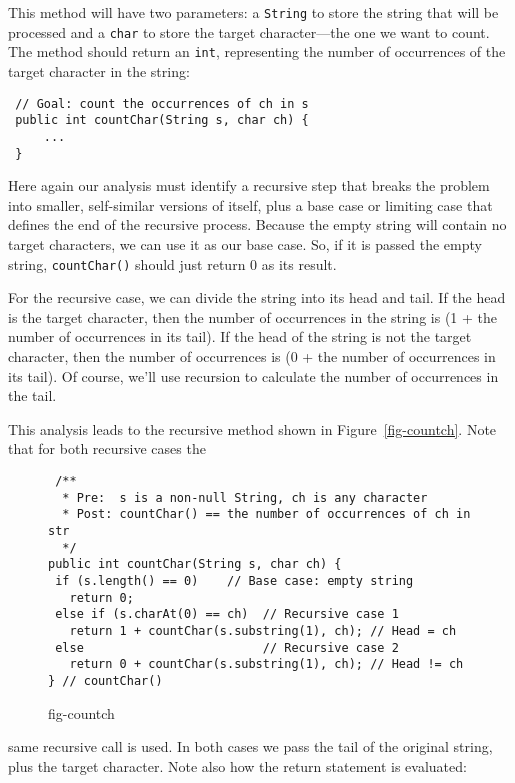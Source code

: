 This method will have two parameters: a {\tt String} to store the
string that will be processed and a {\tt char} to store the
target character---the one we want to count.   The method should
return an {\tt int}, representing the number of occurrences of the
target character in the string:

\begin{jjjlisting}
\begin{lstlisting}
 // Goal: count the occurrences of ch in s
 public int countChar(String s, char ch) {
     ...
 }
\end{lstlisting}
\end{jjjlisting}

Here again our analysis must identify a recursive step that breaks the
problem into smaller, self-similar versions of itself, plus a base
case or limiting case that defines the end of the recursive process.
Because the empty string will contain no target characters, we can use
it as our base case.  So, if it is passed the empty string,
 {\tt countChar()} should just return 0 as its result.

For the recursive case, we can divide the string into its head and
tail.  If the head is the target character, then the number of
occurrences in the string is (1 + the number of occurrences in its
tail). If the head of the string is not the target character, then the
number of occurrences is (0 + the number of occurrences in its tail).  Of
course, we'll use recursion to calculate the number of occurrences in the
tail.


This analysis leads to the recursive method shown in
Figure~\ref{fig-countch}. Note that for both recursive cases the
\begin{figure}[htb]
\jjjprogstart
\begin{jjjlisting}
\begin{lstlisting}
 /**
  * Pre:  s is a non-null String, ch is any character
  * Post: countChar() == the number of occurrences of ch in str
  */
public int countChar(String s, char ch) {
 if (s.length() == 0)    // Base case: empty string
   return 0;
 else if (s.charAt(0) == ch)  // Recursive case 1
   return 1 + countChar(s.substring(1), ch); // Head = ch
 else                         // Recursive case 2
   return 0 + countChar(s.substring(1), ch); // Head != ch
} // countChar()
\end{lstlisting}
\end{jjjlisting}
{fig-countch}
\end{figure}
same recursive call is used.  In both cases we pass the tail of the
original string, plus the target character.  Note also how the
return statement is evaluated:

